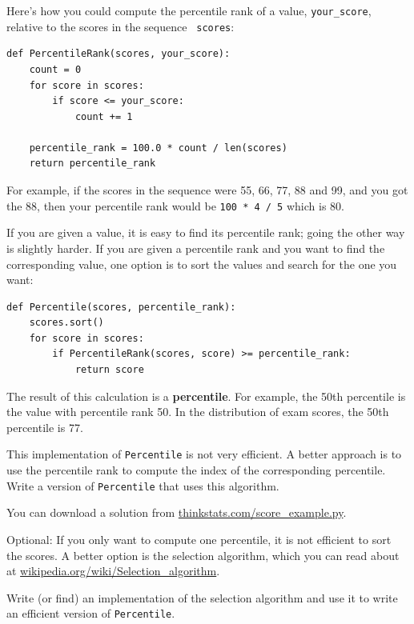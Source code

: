 \documentclass[12pt]{book}
\begin{document}
Here's how you could compute the percentile rank of a value,
\verb"your_score", relative to the scores in the sequence {\tt
  scores}:

\begin{verbatim}
def PercentileRank(scores, your_score):
    count = 0
    for score in scores:
        if score <= your_score:
            count += 1

    percentile_rank = 100.0 * count / len(scores)
    return percentile_rank
\end{verbatim}
%
%
For example, if the scores in the sequence were 55, 66, 77, 88 and 99,
and you got the 88, then your percentile rank would be {\tt 100 * 4 / 5}
which is 80.

If you are given a value, it is easy to find its percentile rank; going
the other way is slightly harder.  If you are given a percentile rank
and you want to find the corresponding value, one option is to
sort the values and search for the one you want:

\begin{verbatim}
def Percentile(scores, percentile_rank):
    scores.sort()
    for score in scores:
        if PercentileRank(scores, score) >= percentile_rank:
            return score
\end{verbatim}

The result of this calculation is a {\bf percentile}.  For example,
the 50th percentile is the value with percentile rank 50.  In the
distribution of exam scores, the 50th percentile is 77.

\begin{ex}
This implementation of {\tt Percentile} is not very efficient.  A
better approach is to use the percentile rank to compute the index of
the corresponding percentile.  Write a version of {\tt Percentile} that
uses this algorithm.

You can download a solution from \url{thinkstats.com/score_example.py}.
\end{ex}

\begin{ex}

Optional: If you only want to compute one percentile, it is not
efficient to sort the scores.  A better option is the selection
algorithm, which you can read about at
\url{wikipedia.org/wiki/Selection_algorithm}.

Write (or find) an implementation of the selection algorithm and use
it to write an efficient version of {\tt Percentile}.

\end{ex}
\end{document}

